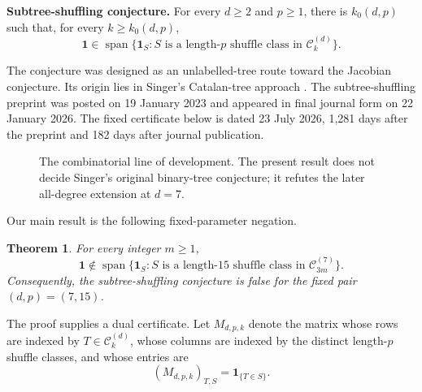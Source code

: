 \documentclass[11pt,reqno]{amsart}
\newtheorem{theorem}{Theorem}[section]
\newcommand{\cC}{\mathcal C}
\newcommand{\one}{\mathbf 1}
\newcommand{\Span}{\operatorname{span}}
\begin{document}
\medskip
\noindent
\textbf{Subtree-shuffling conjecture.}
For every $d\geq2$ and $p\geq1$, there is $k_0(d,p)$ such that, for every
$k\geq k_0(d,p)$,
\[
 \one\in
 \Span\{\one_S:S\text{ is a length-$p$ shuffle class in }\cC_k^{(d)}\}.
\]
\medskip

The conjecture was designed as an unlabelled-tree route toward the Jacobian
conjecture.  Its origin lies in Singer's Catalan-tree approach
\cite{Singer2001,Singer2011}.  The subtree-shuffling preprint was posted on
19 January 2023 and appeared in final journal form on 22 January 2026.
The fixed certificate below is dated 23 July 2026, 1,281 days after the
preprint and 182 days after journal publication.

\begin{figure}[ht]
\centering
{}
\caption{The combinatorial line of development.  The present result does
not decide Singer's original binary-tree conjecture; it refutes the later
all-degree extension at $d=7$.}
\label{fig:timeline}
\end{figure}

Our main result is the following fixed-parameter negation.

\begin{theorem}\label{thm:main}
For every integer $m\geq1$,
\[
 \one\notin
 \Span\{\one_S:S\text{ is a length-$15$ shuffle class in }
 \cC_{3m}^{(7)}\}.
\]
Consequently, the subtree-shuffling conjecture is false for the fixed pair
$(d,p)=(7,15)$.
\end{theorem}

The proof supplies a dual certificate.  Let $M_{d,p,k}$ denote the matrix
whose rows are indexed by $T\in\cC_k^{(d)}$, whose columns are indexed by the
distinct length-$p$ shuffle classes, and whose entries are
\[
 (M_{d,p,k})_{T,S}=\one_{\{T\in S\}}.
\]
\end{document}
